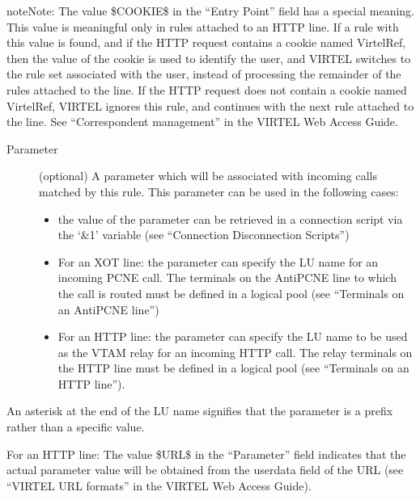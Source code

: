 \documentclass[letterpaper,10pt,english]{sphinxmanual}
\begin{document}
\begin{sphinxadmonition}{note}{Note:}
The value \$COOKIE\$ in the “Entry Point” field has a special meaning. This value is meaningful only in rules attached to an HTTP line. If a rule with this value is found, and if the HTTP request contains a cookie named VirtelRef, then the value of the cookie is used to identify the user, and VIRTEL switches to the rule set associated with the user, instead of processing the remainder of the rules attached to the line. If the HTTP request does not contain a cookie named VirtelRef, VIRTEL ignores this rule, and continues with the next rule attached to the line. See “Correspondent management” in the VIRTEL Web Access Guide.
\end{sphinxadmonition}
\begin{description}
\item[{Parameter}] \leavevmode
(optional) A parameter which will be associated with incoming calls matched by this rule. This parameter can be used in the following cases:
\begin{itemize}
\item {} 
the value of the parameter can be retrieved in a connection script via the ‘\&1’ variable (see “Connection \textendash{} Disconnection Scripts”)

\item {} 
For an XOT line: the parameter can specify the LU name for an incoming PCNE call. The terminals on the AntiPCNE line to which the call is routed must be defined in a logical pool (see “Terminals on an AntiPCNE line”)

\item {} 
For an HTTP line: the parameter can specify the LU name to be used as the VTAM relay for an incoming HTTP call. The relay terminals on the HTTP line must be defined in a logical pool (see “Terminals on an HTTP line”).

\end{itemize}

\end{description}

An asterisk at the end of the LU name signifies that the parameter is a prefix rather than a specific value.

For an HTTP line: The value \$URL\$ in the “Parameter” field indicates that the actual parameter value will be obtained
from the userdata field of the URL (see “VIRTEL URL formats” in the VIRTEL Web Access Guide).
\end{document}
